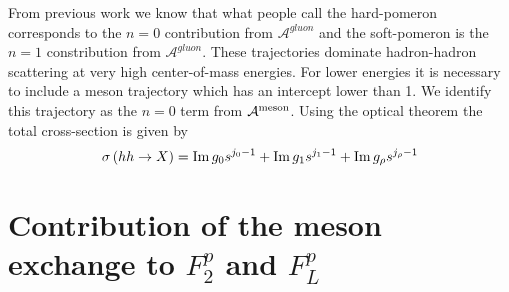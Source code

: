 \documentclass[a4paper,12pt]{article}
\begin{document}
From previous work we know that what people call the hard-pomeron corresponds to the $n=0$ contribution from $\mathcal{A}^{gluon}$ and the soft-pomeron is the $n=1$ constribution from $\mathcal{A}^{gluon}$. These trajectories dominate hadron-hadron scattering at very high center-of-mass energies. For lower energies it is necessary to include a meson trajectory which has an intercept lower than 1. We identify this trajectory as the $n=0$ term from $\mathcal{A}^{\rm {meson}}$. Using the optical theorem the total cross-section is given by
\begin{equation}
\sigma\left(h h \rightarrow X\right) = {\rm Im} \, g_0 s^{j_0 - 1} +  {\rm Im} \, g_1 s^{j_1 - 1} +  {\rm Im} \, g_\rho s^{j_\rho - 1}
\end{equation}

\section{Contribution of the meson exchange to $F^p_2$ and $F^p_L$}
\end{document}
